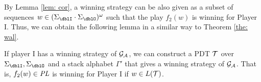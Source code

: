 By Lemma \ref{lem: cor},
a winning strategy can be also given as
a subset of sequences $w\in(\Sigma_\dblI\cdot\Sigma_\dblO)^\omega$
such that the play $f_2(w)$ is winning for Player I.
Thus, we can obtain the following lemma
in a similar way to Theorem \ref{the: wal}.
\begin{corollary}
\label{col: 2}
If player I has a winning strategy of ${\cal G}_{\cal A}$,
we can construct a PDT ${\cal T}$ over $\Sigma_\dblI, \Sigma_\dblO$ and
a stack alphabet $\Gamma'$ that gives a winning strategy of ${\cal G}_{\cal A}$.
That is, $f_2(w)\in \mathit{PL}$ is winning for Player I if $w\in L({\cal T})$.
\end{corollary}
